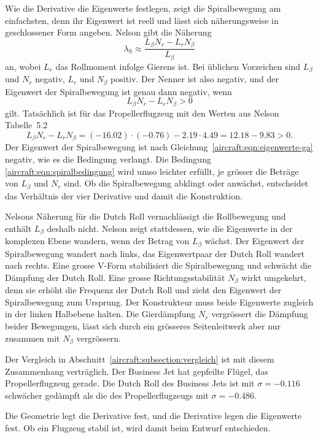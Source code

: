 Wie die Derivative die Eigenwerte festlegen, zeigt die Spiralbewegung am
einfachsten, denn ihr Eigenwert ist reell und lässt sich näherungsweise in
geschlossener Form angeben.
Nelson \cite{aircraft:nelson} gibt die Näherung
\begin{equation}
    \lambda_{\text{S}}
    \approx
    \frac{L_\beta N_r - L_r N_\beta}{L_\beta}
    \label{aircraft:eqn:spiralnaeherung}
\end{equation}
an, wobei $L_r$ das Rollmoment infolge Gierens ist.
Bei üblichen Vorzeichen sind $L_\beta$ und $N_r$ negativ, $L_r$ und $N_\beta$
positiv.
Der Nenner ist also negativ, und der Eigenwert der Spiralbewegung ist genau dann
negativ, wenn
\begin{equation}
    L_\beta N_r - L_r N_\beta > 0
    \label{aircraft:eqn:spiralbedingung}
\end{equation}
gilt.
Tatsächlich ist für das Propellerflugzeug mit den Werten aus Nelson Tabelle~5.2
\[
    L_\beta N_r - L_r N_\beta
    =
    (-16.02)\cdot(-0.76) - 2.19\cdot 4.49
    =
    12.18 - 9.83
    >
    0.
\]
Der Eigenwert der Spiralbewegung ist nach
Gleichung~\eqref{aircraft:eqn:eigenwerte-ga} negativ, wie es die Bedingung
verlangt.
Die Bedingung \eqref{aircraft:eqn:spiralbedingung} wird umso leichter erfüllt,
je grösser die Beträge von $L_\beta$ und $N_r$ sind.
Ob die Spiralbewegung abklingt oder anwächst, entscheidet das Verhältnis der
vier Derivative und damit die Konstruktion.

Nelsons Näherung für die Dutch Roll vernachlässigt die Rollbewegung und enthält
$L_\beta$ deshalb nicht.
Nelson \cite[Abb.~5.14]{aircraft:nelson} zeigt stattdessen, wie die Eigenwerte
in der komplexen Ebene wandern, wenn der Betrag von $L_\beta$ wächst.
Der Eigenwert der Spiralbewegung wandert nach links, das Eigenwertpaar der
Dutch Roll wandert nach rechts.
Eine grosse V-Form stabilisiert die Spiralbewegung und schwächt die Dämpfung der
Dutch Roll.
Eine grosse Richtungsstabilität $N_\beta$ wirkt umgekehrt, denn sie erhöht die
Frequenz der Dutch Roll und zieht den Eigenwert der Spiralbewegung zum Ursprung.
Der Konstrukteur muss beide Eigenwerte zugleich in der linken Halbebene halten.
Die Gierdämpfung $N_r$ vergrössert die Dämpfung beider Bewegungen, lässt sich
durch ein grösseres Seitenleitwerk aber nur zusammen mit $N_\beta$ vergrössern.

Der Vergleich in Abschnitt~\ref{aircraft:subsection:vergleich} ist mit diesem
Zusammenhang verträglich.
Der Business Jet hat gepfeilte Flügel, das Propellerflugzeug gerade.
Die Dutch Roll des Business Jets ist mit $\sigma = -0.116$ schwächer gedämpft
als die des Propellerflugzeugs mit $\sigma = -0.486$.

Die Geometrie legt die Derivative fest, und die Derivative legen die
Eigenwerte fest.
Ob ein Flugzeug stabil ist, wird damit beim Entwurf entschieden.
